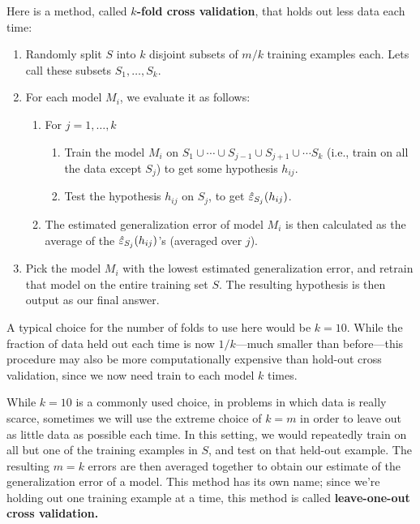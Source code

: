 \documentclass{article}
\begin{document}
Here is a method, 
called {\bf $k$-fold
cross validation}, that 
holds out less data each time:
\begin{enumerate}
\item Randomly split $S$ into $k$ disjoint subsets of $m/k$ training examples each.  Lets
call these subsets $S_1, \ldots, S_k$.
\item For each model $M_i$, we evaluate it as follows:
\begin{enumerate}
\item[] For $j=1, \ldots, k$
\begin{enumerate}
\item[] Train the model $M_i$ on $S_1 \cup \cdots \cup S_{j-1} \cup S_{j+1} \cup \cdots S_{k}$
(i.e., train on all the data except $S_j$)
to get some hypothesis $h_{ij}$.  
\item[] Test the hypothesis $h_{ij}$ on $S_j$, to get $\hat\varepsilon_{S_j}(h_{ij})$.
\end{enumerate}
\item[] The estimated generalization error of model $M_i$ is then calculated as the average
of the $\hat\varepsilon_{S_j}(h_{ij})$'s (averaged over $j$).
\end{enumerate}
\item Pick the model $M_i$ with the lowest estimated generalization error, and retrain
that model on the entire training set $S$.  The resulting hypothesis is then output 
as our final answer. 
\end{enumerate}

A typical choice for the number of folds to use here would be $k=10$.  While the fraction
of data held out each time is now $1/k$---much smaller than before---this procedure may
also be more computationally expensive than hold-out cross
validation, since we now need train to each model $k$ times.

While $k=10$ is a commonly used choice, in problems in which data is really scarce, 
sometimes we will use the extreme choice of $k=m$ in order to leave out as little data as possible
each time.  In this setting, we would repeatedly train on all but one of the 
training examples in $S$, and test on that held-out example.  The resulting $m=k$ errors
are then averaged together to obtain our estimate of the generalization error of a model.
This method has its own name; 
since we're holding out one training example at a time, 
this method is called {\bf leave-one-out cross validation.}
\end{document}
